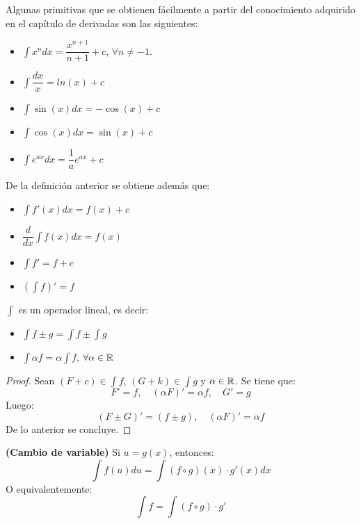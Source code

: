 \begin{proposicion}
	Algunas primitivas que se obtienen fácilmente a partir del conocimiento adquirido en el capítulo de derivadas son las siguientes: 
	\begin{itemize}
		\item $\displaystyle \int x^n dx = \dfrac{x^{n+1}}{n+1} + c$, $\forall n \neq -1$. 
		\item $\displaystyle \int \dfrac{dx}{x} = ln (x) + c $
		\item $\displaystyle \int \sin(x)dx = - \cos(x) + c $
		\item $\displaystyle \int \cos(x)dx = \sin(x) + c$
		\item $\displaystyle \int e^{ax}dx = \dfrac{1}{a} e^{ax} + c$
	\end{itemize}
\end{proposicion}

\begin{proposicion}
	De la definición anterior se obtiene además que: 
	\begin{itemize}
		\item $\displaystyle \int f'(x) dx = f(x) + c$
		\item $\dfrac{d}{dx} \displaystyle \int f(x) dx = f(x)$
		\item $\displaystyle \int f' = f + c $
		\item $\displaystyle \left(\int f \right)' = f$ 
	\end{itemize}
\end{proposicion}

\begin{proposicion}
	$\displaystyle \int$ es un operador lineal, es decir: 
	\begin{itemize}
		\item $\displaystyle \int f \pm g = \int f \pm \int g$
		\item $\displaystyle \int \alpha f = \alpha \int f$, $\forall \alpha \in \mathbb{R}$
	\end{itemize}
\end{proposicion}

\begin{proof}
	Sean $(F + c) \in \displaystyle \int f$, $(G + k) \in \displaystyle \int g$ y $\alpha \in \mathbb{R}$. Se tiene que: 
	$$  F ' = f, \quad (\alpha F)' = \alpha f, \quad G' = g $$
	Luego: 
	$$ (F \pm G)' = (f \pm g) , \quad (\alpha F)' = \alpha f $$ 
	De lo anterior se concluye. 	
\end{proof}

\begin{teorema}
	\textbf{(Cambio de variable)} Si $u = g(x)$, entonces: 
	$$ \displaystyle \int f(u) du = \int (f \circ g)(x) \cdot g'(x) dx $$ 
	O equivalentemente: 
	$$ \displaystyle \int f = \int (f \circ g) \cdot g' $$ 
\end{teorema}

